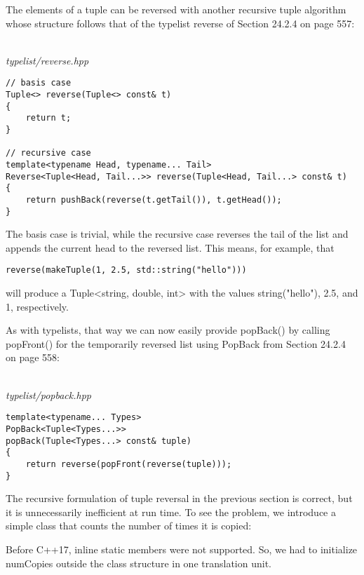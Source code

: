 The elements of a tuple can be reversed with another recursive tuple algorithm whose structure follows that of the typelist reverse of Section 24.2.4 on page 557:

\hspace*{\fill} \\ %
\noindent
\textit{typelist/reverse.hpp}
\begin{lstlisting}[style=styleCXX]
// basis case
Tuple<> reverse(Tuple<> const& t)
{
	return t;
}

// recursive case
template<typename Head, typename... Tail>
Reverse<Tuple<Head, Tail...>> reverse(Tuple<Head, Tail...> const& t)
{
	return pushBack(reverse(t.getTail()), t.getHead());
}
\end{lstlisting}

The basis case is trivial, while the recursive case reverses the tail of the list and appends the current head to the reversed list. This means, for example, that

\begin{lstlisting}[style=styleCXX]
reverse(makeTuple(1, 2.5, std::string("hello")))
\end{lstlisting}

will produce a Tuple<string, double, int> with the values string("hello"), 2.5, and 1, respectively.

As with typelists, that way we can now easily provide popBack() by calling popFront() for the temporarily reversed list using PopBack from Section 24.2.4 on page 558:

\hspace*{\fill} \\ %
\noindent
\textit{typelist/popback.hpp}
\begin{lstlisting}[style=styleCXX]
template<typename... Types>
PopBack<Tuple<Types...>>
popBack(Tuple<Types...> const& tuple)
{
	return reverse(popFront(reverse(tuple)));
}
\end{lstlisting}


The recursive formulation of tuple reversal in the previous section is correct, but it is unnecessarily inefficient at run time. To see the problem, we introduce a simple class that counts the number of times it is copied:

\begin{tcolorbox}[colback=webgreen!5!white,colframe=webgreen!75!black]
\hspace*{0.75cm}Before C++17, inline static members were not supported. So, we had to initialize numCopies outside the class structure in one translation unit.
\end{tcolorbox}


